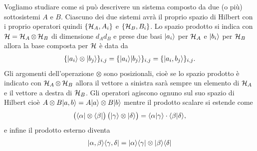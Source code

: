 Vogliamo studiare come si può descrivere un sistema composto da due (o più) sottosistemi $ A $ e $ B $. Ciascuno dei due sistemi avrà il proprio spazio 
di Hilbert con i proprio operatori quindi $ \{\operatorname{\mathcal{H}}_A, A_i\} $ e $ \{\operatorname{\mathcal{H}}_B, B_i\} $. Lo spazio prodotto si indica con $ \operatorname{\mathcal{H}} = \operatorname{\mathcal{H}}_A \otimes \operatorname{\mathcal{H}}_B $ 
di dimensione $ d_A d_B $ e prese due basi $ \vert a_i \rangle $ per $ \operatorname{\mathcal{H}}_A $ e $ \vert b_i \rangle $ per $ \operatorname{\mathcal{H}}_B $ allora la base composta per $ \operatorname{\mathcal{H}} $ è data da 
\begin{align*}
  \{\vert a_i \rangle \otimes \vert b_j \rangle\}_{i,j} = \{\vert a_i \rangle \vert b_j \rangle\}_{i,j} = \{\vert a_i,b_j \rangle\}_{i,j}.
\end{align*}
Gli argomenti dell'operazione $ \otimes $ sono posizionali, cioè se lo spazio prodotto è indicato con $ \operatorname{\mathcal{H}}_A \otimes \operatorname{\mathcal{H}}_B $ allora il vettore a sinistra 
sarà sempre un elemento di $ \operatorname{\mathcal{H}}_A $ e il vettore a destra di $ \operatorname{\mathcal{H}}_B $. Gli operatori agiscono ognuno sul suo spazio di Hilbert 
cioè $ A \otimes B \vert a,b \rangle = A \vert a \rangle \otimes B \vert b \rangle $ mentre il prodotto scalare si estende come 
\begin{align*}
  \left( \phb \b{\alpha} \otimes \b{\beta} \right) \left( \phb \k{\gamma} \otimes \k{\delta} \right) = \bk{\alpha | \gamma} \cdot \bk{\beta | \delta},
\end{align*}
e infine il prodotto esterno diventa 
\begin{align*}
  \vert \alpha, \beta \rangle \langle \gamma, \delta \vert = \vert \alpha \rangle \langle \gamma \vert \otimes \vert \beta \rangle \langle \delta \vert
\end{align*}

